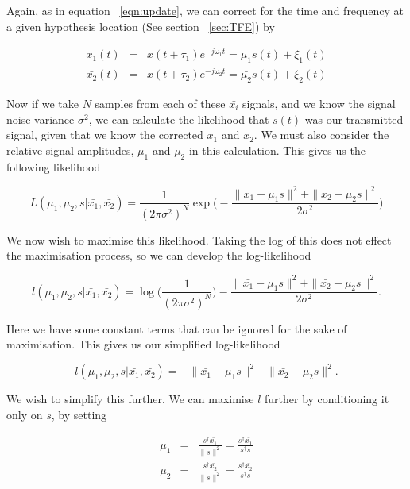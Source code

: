 \documentclass[12pt,openany,a4paper]{book}
\begin{document}
\bigskip

Again, as in equation ~\ref{eqn:update}, we can correct for the time and frequency at a given hypothesis location (See section ~\ref{sec:TFE}) by

\begin{eqnarray}
\bar{x_1}(t) & = & x(t+\tau_1) e^{-j\omega_1 t} = \bar{\mu_1} s(t) + \xi_1(t) \\
\bar{x_2}(t) & = & x(t+\tau_2) e^{-j\omega_2 t} = \bar{\mu_2} s(t) + \xi_2(t)
\end{eqnarray}

\bigskip

Now if we take $N$ samples from each of these $\bar{x_i}$ signals, and we know the signal noise variance $\sigma^2$, we can calculate the likelihood that $s(t)$ was our transmitted signal, given that we know the corrected $\bar{x_1}$ and $\bar{x_2}$. We must also consider the relative signal amplitudes, $\mu_1$ and $\mu_2$ in this calculation. This gives us the following likelihood

\begin{equation}
L(\mu_1,\mu_2, s | \bar{x_1}, \bar{x_2}) = \frac{1}{(2\pi\sigma^2)^N} \exp{
\Bigg(- \frac{\| \bar{x_1}-\mu_1 s\|^2 + \| \bar{x_2}-\mu_2 s\|^2}{2\sigma^2} \Bigg)}
\end{equation}

\bigskip

We now wish to maximise this likelihood. Taking the log of this does not effect the maximisation process, so we can develop the log-likelihood

\begin{equation}
l(\mu_1,\mu_2, s | \bar{x_1}, \bar{x_2}) = \log{\Bigg(\frac{1}{(2\pi\sigma^2)^N}\Bigg)}
- \frac{\| \bar{x_1}-\mu_1 s\|^2 + \| \bar{x_2}-\mu_2 s\|^2}{2\sigma^2}.
\end{equation}

\bigskip

Here we have some constant terms that can be ignored for the sake of maximisation. This gives us our simplified log-likelihood

\begin{equation}
l(\mu_1,\mu_2, s | \bar{x_1}, \bar{x_2}) = - \| \bar{x_1}-\mu_1 s\|^2 - \| \bar{x_2}-\mu_2 s\|^2.
\end{equation}

\bigskip

We wish to simplify this further. We can maximise $l$ further by conditioning it only on $s$, by setting

\begin{eqnarray}
\mu_1 & = & \frac{s^\dagger \bar{x_1}}{\|s\|^2} =  \frac{s^\dagger \bar{x_1}}{s^\dagger s}\\
\mu_2 & = & \frac{s^\dagger \bar{x_2}}{\|s\|^2} =  \frac{s^\dagger \bar{x_2}}{s^\dagger s}
\end{eqnarray}
\end{document}

